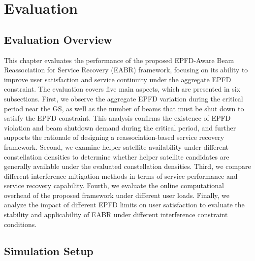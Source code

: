 

\section{Evaluation}
\label{sec:chapter6}

\subsection{Evaluation Overview}

This chapter evaluates the performance of the proposed EPFD-Aware Beam Reassociation for Service Recovery (EABR) framework, focusing on its ability to improve user satisfaction and service continuity under the aggregate EPFD constraint. The evaluation covers five main aspects, which are presented in six subsections. First, we observe the aggregate EPFD variation during the critical period near the GS, as well as the number of beams that must be shut down to satisfy the EPFD constraint. This analysis confirms the existence of EPFD violation and beam shutdown demand during the critical period, and further supports the rationale of designing a reassociation-based service recovery framework. Second, we examine helper satellite availability under different constellation densities to determine whether helper satellite candidates are generally available under the evaluated constellation densities. Third, we compare different interference mitigation methods in terms of service performance and service recovery capability. Fourth, we evaluate the online computational overhead of the proposed framework under different user loads. Finally, we analyze the impact of different EPFD limits on user satisfaction to evaluate the stability and applicability of EABR under different interference constraint conditions.

\subsection{Simulation Setup}

